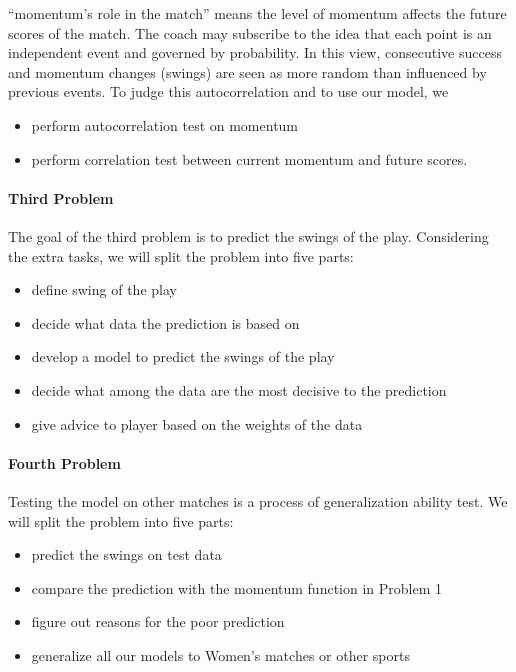 ``momentum's role in the match'' means the level of momentum affects the future scores of the match.
The coach may subscribe to the idea that each point is an independent event and governed by probability.
In this view, consecutive success and momentum changes (swings) are seen as more random than influenced by previous events.
To judge this autocorrelation and to use our model, we 

\begin{itemize}
    \item perform autocorrelation test on momentum
    \item perform correlation test between current momentum and future scores.
\end{itemize}

\paragraph{Third Problem}

The goal of the third problem is to predict the swings of the play.
Considering the extra tasks, we will split the problem into five parts:
\begin{itemize}
    \item define swing of the play
    \item decide what data the prediction is based on
    \item develop a model to predict the swings of the play
    \item decide what among the data are the most decisive to the prediction
    \item give advice to player based on the weights of the data
\end{itemize}

\paragraph{Fourth Problem}

Testing the model on other matches is a process of generalization ability test.
We will split the problem into five parts:
\begin{itemize}
    \item predict the swings on test data
    \item compare the prediction with the momentum function in Problem 1
    \item figure out reasons for the poor prediction
    \item generalize all our models to Women's matches or other sports
\end{itemize}

